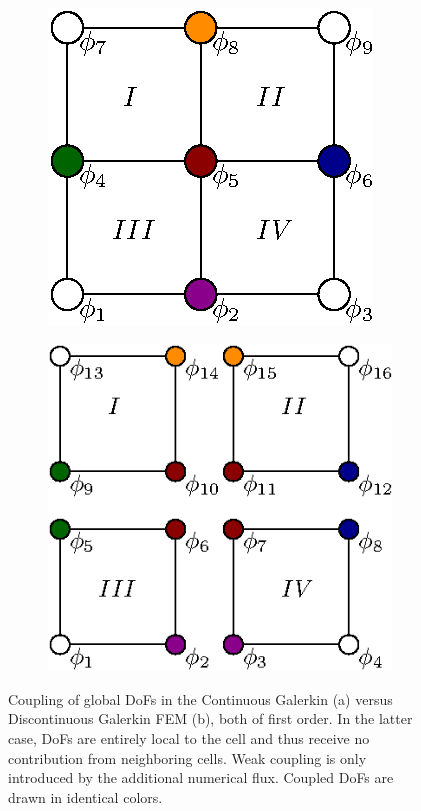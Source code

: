\documentclass[asi,article,submit,moreauthors]{Definitions/mdpi}
\begin{document}
\begin{figure}[htbp!]
    \centering
    \captionsetup[subfigure]{justification=centering}
    \begin{subfigure}[c]{0.49\textwidth}
        \centering
        \includegraphics[]{Figs/Theory/cg-2d.eps}
        \caption{}
        \vfill
        \label{fig:cg-2d}
    \end{subfigure}
    \begin{subfigure}[c]{0.49\textwidth}
        \centering
        \includegraphics[]{Figs/Theory/dg-2d.eps}
        \caption{}
        \label{fig:dg-2d}
    \end{subfigure}
   \caption{Coupling of global DoFs in the Continuous Galerkin (a) versus Discontinuous Galerkin FEM (b), both of first order. In the latter case, DoFs are entirely local to the cell and thus receive no contribution from neighboring cells. Weak coupling is only introduced by the additional numerical flux. Coupled DoFs are drawn in identical colors.}
   \label{fig:cg-vs-dg-2d}
\end{figure}
\end{document}
